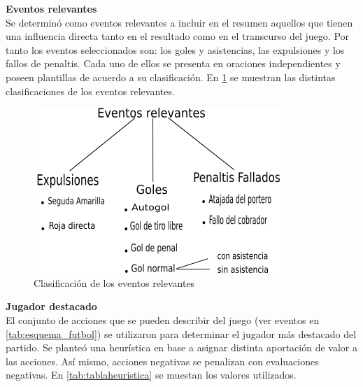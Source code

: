    \textbf{Eventos relevantes}\\

    Se determinó como eventos relevantes a incluir en el resumen aquellos que tienen una influencia directa 
tanto en el resultado como en el transcurso del juego. Por tanto los eventos seleccionados son: los goles y asistencias, 
las expulsiones y los fallos de penaltis. Cada uno de ellos se presenta en oraciones independientes y poseen plantillas de acuerdo 
a su clasificación. En \ref{fig_clasificacioneventos} se muestran las distintas clasificaciones de los eventos relevantes.\\


    \begin{figure}[!]
        \begin{center}
            \includegraphics[scale=0.9]{Graphics/clasificacioneventosrel.png}
        \end{center}
        \caption{Clasificación de los eventos relevantes}
        \label{fig_clasificacioneventos}
    \end{figure}

    \textbf{Jugador destacado}\\

    El conjunto de acciones que se pueden describir del juego (ver eventos en \ref{tab:esquema_futbol}) se utilizaron para 
determinar el jugador más destacado del partido. Se planteó una heurística en base a asignar distinta aportación de valor a 
las acciones. Así mismo, acciones negativas se penalizan con evaluaciones negativas. En \ref{tab:tablaheuristica} se muestan los valores utilizados.



